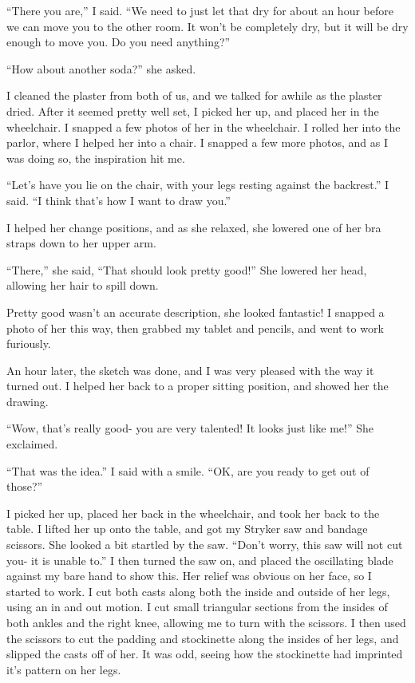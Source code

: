 ``There you are,'' I said. ``We need to just let that dry for about an hour before we can
move you to the other room. It won't be completely dry, but it will be dry enough to move you.
Do you need anything?''

``How about another soda?'' she asked.

I cleaned the plaster from both of us, and we talked for awhile as the plaster dried. After
it seemed pretty well set, I picked her up, and placed her in the wheelchair. I snapped a few
photos of her in the wheelchair. I rolled her into the parlor, where I helped her into a chair.
I snapped a few more photos, and as I was doing so, the inspiration hit me.

``Let's have you lie on the chair, with your legs resting against the backrest.'' I said.
``I think that's how I want to draw you.''

I helped her change positions, and as she relaxed, she lowered one of her bra straps down to
her upper arm.

``There,'' she said, ``That should look pretty good!'' She lowered her head, allowing her
hair to spill down.

Pretty good wasn't an accurate description, she looked fantastic! I snapped a photo of her
this way, then grabbed my tablet and pencils, and went to work furiously.

An hour later, the sketch was done, and I was very pleased with the way it turned out. I
helped her back to a proper sitting position, and showed her the drawing.

``Wow, that's really good- you are very talented! It looks just like me!'' She exclaimed.

``That was the idea.'' I said with a smile. ``OK, are you ready to get out of those?''

I picked her up, placed her back in the wheelchair, and took her back to the table. I lifted
her up onto the table, and got my Stryker saw and bandage scissors. She looked a bit startled by
the saw. ``Don't worry, this saw will not cut you- it is unable to.'' I then turned the saw on,
and placed the oscillating blade against my bare hand to show this. Her relief was obvious on
her face, so I started to work. I cut both casts along both the inside and outside of her legs,
using an in and out motion. I cut small triangular sections from the insides of both ankles and
the right knee, allowing me to turn with the scissors. I then used the scissors to cut the
padding and stockinette along the insides of her legs, and slipped the casts off of her. It was
odd, seeing how the stockinette had imprinted it's pattern on her legs.

